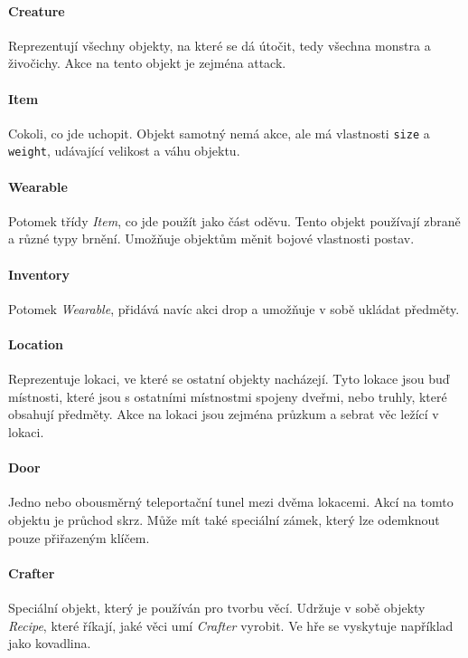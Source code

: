 \documentclass[11pt, a4paper]{article}
\def\class#1{\emph{#1}}
\begin{document}
\paragraph{Creature} Reprezentují všechny objekty, na které se dá útočit, tedy všechna monstra a živočichy. Akce na tento objekt je zejména attack.

\paragraph{Item} Cokoli, co jde uchopit. Objekt samotný nemá akce, ale má vlastnosti \texttt{size} a \texttt{weight}, udávající velikost a váhu objektu.

\paragraph{Wearable} Potomek třídy \class{Item}, co jde použít jako část oděvu. Tento objekt používají zbraně a různé typy brnění. Umožňuje objektům měnit bojové vlastnosti postav.

\paragraph{Inventory} Potomek \class{Wearable}, přidává navíc akci drop a umožňuje v sobě ukládat předměty.

\paragraph{Location} Reprezentuje lokaci, ve které se ostatní objekty nacházejí. Tyto lokace jsou buď místnosti, které jsou s ostatními místnostmi spojeny dveřmi, nebo truhly, které obsahují předměty. Akce na lokaci jsou zejména průzkum a sebrat věc ležící v lokaci.

\paragraph{Door} Jedno nebo obousměrný teleportační tunel mezi dvěma lokacemi. Akcí na tomto objektu je průchod skrz. Může mít také speciální zámek, který lze odemknout pouze přiřazeným klíčem.

\paragraph{Crafter} Speciální objekt, který je používán pro tvorbu věcí. Udržuje v sobě objekty \class{Recipe}, které říkají, jaké věci umí \class{Crafter} vyrobit. Ve hře se vyskytuje například jako kovadlina.
\end{document}
